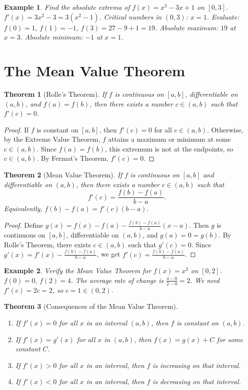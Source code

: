 \documentclass[11pt,a4paper]{article}
\newtheorem{example}{Example}
\newtheorem{theorem}{Theorem}
\begin{document}
\begin{example}
Find the absolute extrema of $f(x) = x^3 - 3x + 1$ on $[0, 3]$.
$f'(x) = 3x^2 - 3 = 3(x^2 - 1)$. Critical numbers in $(0, 3)$: $x = 1$.
Evaluate: $f(0) = 1$, $f(1) = -1$, $f(3) = 27 - 9 + 1 = 19$.
Absolute maximum: $19$ at $x = 3$. Absolute minimum: $-1$ at $x = 1$.
\end{example}
\section{The Mean Value Theorem}
\begin{theorem}[Rolle's Theorem]
If $f$ is continuous on $[a, b]$, differentiable on $(a, b)$, and $f(a) = f(b)$, then there exists a number $c \in (a, b)$ such that $f'(c) = 0$.
\end{theorem}
\begin{proof}
If $f$ is constant on $[a, b]$, then $f'(c) = 0$ for all $c \in (a, b)$. Otherwise, by the Extreme Value Theorem, $f$ attains a maximum or minimum at some $c \in (a, b)$. Since $f(a) = f(b)$, this extremum is not at the endpoints, so $c \in (a, b)$. By Fermat's Theorem, $f'(c) = 0$.
\end{proof}
\begin{theorem}[Mean Value Theorem]
If $f$ is continuous on $[a, b]$ and differentiable on $(a, b)$, then there exists a number $c \in (a, b)$ such that
\[
f'(c) = \frac{f(b) - f(a)}{b - a}.
\]
Equivalently, $f(b) - f(a) = f'(c)(b - a)$.
\end{theorem}
\begin{proof}
Define $g(x) = f(x) - f(a) - \frac{f(b) - f(a)}{b - a}(x - a)$. Then $g$ is continuous on $[a, b]$, differentiable on $(a, b)$, and $g(a) = 0 = g(b)$. By Rolle's Theorem, there exists $c \in (a, b)$ such that $g'(c) = 0$. Since $g'(x) = f'(x) - \frac{f(b) - f(a)}{b - a}$, we get $f'(c) = \frac{f(b) - f(a)}{b - a}$.
\end{proof}
\begin{example}
Verify the Mean Value Theorem for $f(x) = x^2$ on $[0, 2]$.
$f(0) = 0$, $f(2) = 4$. The average rate of change is $\frac{4 - 0}{2 - 0} = 2$. We need $f'(c) = 2c = 2$, so $c = 1 \in (0, 2)$.
\end{example}
\begin{theorem}[Consequences of the Mean Value Theorem]
\begin{enumerate}
\item If $f'(x) = 0$ for all $x$ in an interval $(a, b)$, then $f$ is constant on $(a, b)$.
\item If $f'(x) = g'(x)$ for all $x$ in $(a, b)$, then $f(x) = g(x) + C$ for some constant $C$.
\item If $f'(x) > 0$ for all $x$ in an interval, then $f$ is increasing on that interval.
\item If $f'(x) < 0$ for all $x$ in an interval, then $f$ is decreasing on that interval.
\end{enumerate}
\end{theorem}
\end{document}
